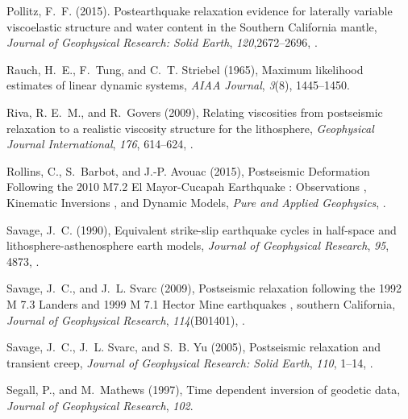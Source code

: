 \documentclass[draft,linenumbers]{AGUJournal}
\begin{document}
\begin{thebibliography}{52}
Pollitz, F.~F. (2015). {Postearthquake relaxation evidence for laterally variable viscoelastic structure and water content in the Southern California mantle}, \textit{Journal of Geophysical Research: Solid Earth}, \textit{120},2672--2696, .

Rauch, H.~E., F.~Tung, and C.~T. Striebel (1965), {Maximum likelihood estimates
  of linear dynamic systems}, \textit{AIAA Journal}, \textit{3}(8), 1445--1450.

Riva, R. E.~M., and R.~Govers (2009), {Relating viscosities from postseismic
  relaxation to a realistic viscosity structure for the lithosphere},
  \textit{Geophysical Journal International}, \textit{176}, 614--624,
  .

Rollins, C., S.~Barbot, and J.-P. Avouac (2015), {Postseismic Deformation
  Following the 2010 M7.2 El Mayor-Cucapah Earthquake : Observations ,
  Kinematic Inversions , and Dynamic Models}, \textit{Pure and Applied
  Geophysics}, .

Savage, J.~C. (1990), {Equivalent strike-slip earthquake cycles in half-space
  and lithosphere-asthenosphere earth models}, \textit{Journal of Geophysical
  Research}, \textit{95}, 4873, .

Savage, J.~C., and J.~L. Svarc (2009), {Postseismic relaxation following the
  1992 M 7.3 Landers and 1999 M 7.1 Hector Mine earthquakes , southern
  California}, \textit{Journal of Geophysical Research}, \textit{114}(B01401),
  .

Savage, J.~C., J.~L. Svarc, and S.~B. Yu (2005), {Postseismic relaxation and
  transient creep}, \textit{Journal of Geophysical Research: Solid Earth},
  \textit{110}, 1--14, .

Segall, P., and M.~Mathews (1997), {Time dependent inversion of geodetic data},
  \textit{Journal of Geophysical Research}, \textit{102}.


\end{thebibliography}
\end{document}

